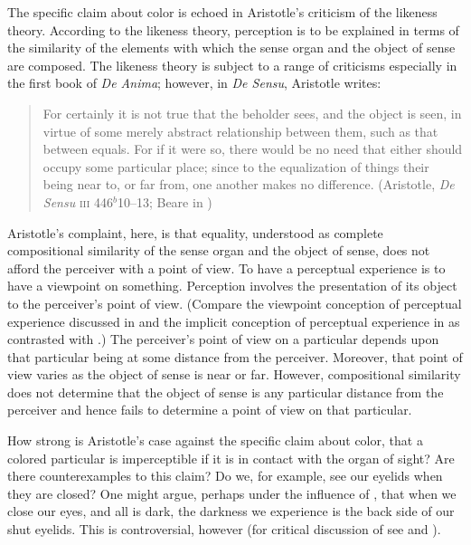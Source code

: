 The specific claim about color is echoed in Aristotle's criticism of the likeness theory. According to the likeness theory, perception is to be explained in terms of the similarity of the elements with which the sense organ and the object of sense are composed. The likeness theory is subject to a range of criticisms especially in the first book of \emph{De Anima}; however, in \emph{De Sensu}, Aristotle writes:
\begin{quote}
	For certainly it is not true that the beholder sees, and the object is seen, in virtue of some merely abstract relationship between them, such as that between equals. For if it were so, there would be no need that either should occupy some particular place; since to the equalization of things their being near to, or far from, one another makes no difference. (Aristotle, \emph{De Sensu} \textsc{iii} 446\( ^{b} \)10--13; Beare in \citealt[20]{Barnes:1984uq})
\end{quote}
Aristotle's complaint, here, is that equality, understood as complete compositional similarity of the sense organ and the object of sense, does not afford the perceiver with a point of view. To have a perceptual experience is to have a viewpoint on something. Perception involves the presentation of its object to the perceiver's point of view. (Compare the viewpoint conception of perceptual experience discussed in \citealt{Martin:1998nx} and the implicit conception of perceptual experience in \citealt{Nagel:1979fk} as contrasted with \citealt{Jackson:1982my}.) The perceiver's point of view on a particular depends upon that particular being at some distance from the perceiver. Moreover, that point of view varies as the object of sense is near or far. However, compositional similarity does not determine that the object of sense is any particular distance from the perceiver and hence fails to determine a point of view on that particular.

How strong is Aristotle's case against the specific claim about color, that a colored particular is imperceptible if it is in contact with the organ of sight? Are there counterexamples to this claim? Do we, for example, see our eyelids when they are closed? One might argue, perhaps under the influence of \citet{Sorensen:2008kx}, that when we close our eyes, and all is dark, the darkness we experience is the back side of our shut eyelids. This is controversial, however (for critical discussion of \citealt{Sorensen:2008kx} see \citealt{Soteriou:2011fk} and \citealt{Phillips:2013ph}). 

